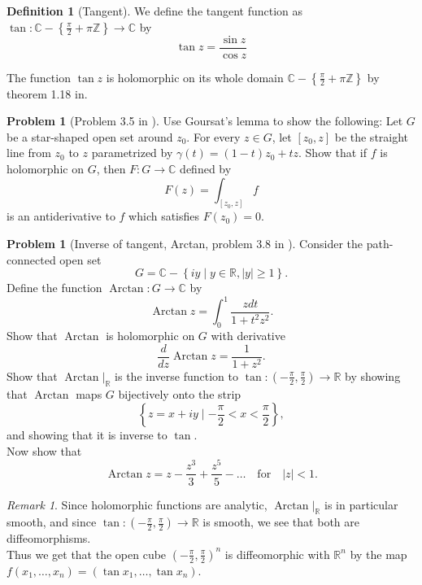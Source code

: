 \documentclass[reqno]{amsart}
\theoremstyle{plain}%
\theoremstyle{definition}
\newtheorem{definition}[theorem]{Definition}
\newtheorem{problem}[theorem]{Problem}
\theoremstyle{remark}
\newtheorem*{remark}{Remark}
\DeclareMathOperator{\Arctan}{Arctan}
\begin{document}
    \begin{definition}[Tangent]
        We define the tangent function as $\tan  \colon
        \mathbb{C} - \left\{ \frac{\pi}{2} + \pi \mathbb{Z} \right\} 
        \to \mathbb{C}$ by
        \[
        \tan z = \frac{\sin z}{\cos z}
        \] 
    \end{definition}
    The function $\tan z$ is holomorphic on its whole domain
    $\mathbb{C} - \left\{ \frac{\pi}{2} + \pi \mathbb{Z} \right\} $ by
    theorem 1.18 in. \cite{Berg}

    \begin{problem}[Problem 3.5 in \cite{Berg}]
        Use Goursat's lemma to show the following: Let
        $G$ be a star-shaped open set around $z_0$. For every
        $z \in G$, let $\left[ z_0, z \right] $ be the straight
        line from $z_0$ to $z$ parametrized by
        $\gamma (t) = \left( 1-t \right) z_0 + tz$. Show that
        if $f$ is holomorphic on $G$, then
        $F  \colon G \to \mathbb{C}$ defined by
        \[
        F(z) = \int_{\left[ z_0, z \right] } f
        \] 
        is an antiderivative to $f$ which satisfies
        $F(z_0) = 0$.
    \end{problem}
    

    \begin{problem}[Inverse of tangent, Arctan, problem 3.8 in
        \cite{Berg}]
    Consider the path-connected open set
    \[
    G = \mathbb{C} - \left\{ iy  \mid y\in \mathbb{R},
    \left| y \right| \ge 1 \right\} .
    \] 
    Define the function $\Arctan  \colon G \to \mathbb{C}$ by
    \[
    \Arctan z = \int_{0}^{1}  \frac{z dt}{1+ t^2 z^2}. 
    \] 
    Show that $\Arctan$ is holomorphic on $G$ with derivative
    \[
    \frac{d}{dz} \Arctan z = \frac{1}{1+ z^2}.
    \] 
    Show that $\Arctan |_{\mathbb{R}}$ is the inverse
    function to $\tan  \colon \left( -\frac{\pi}{2},\frac{\pi}{2} \right)
    \to \mathbb{R}$ by showing that $\Arctan$ maps $G$ bijectively
    onto the strip
    \[
    \left\{ z = x+iy  \mid 
    -\frac{\pi}{2} < x < \frac{\pi}{2} \right\} ,
    \] 
    and showing that it is inverse to $\tan $.\\
    Now show that
    \[
    \Arctan z = z - \frac{z^3}{3} + \frac{z^{5}}{5} -\ldots 
    \quad \text{for} \quad \left| z \right| <1.
    \] 
    
    
    
    
    \end{problem}

\begin{remark}
    Since holomorphic functions are analytic, $\Arctan|_{\mathbb{R}}$ 
    is in particular smooth, and since $\tan  \colon
    \left( - \frac{\pi}{2}, \frac{\pi}{2} \right) \to \mathbb{R}$ 
    is smooth, we see that both are diffeomorphisms.\\
    Thus we get that the open cube
    $\left( -\frac{\pi}{2},\frac{\pi}{2} \right)^{n}$ is diffeomorphic
    with $\mathbb{R}^{n}$ by the map
    $f (x_1,\ldots, x_n) = \left( \tan x_1, \ldots, \tan x_n \right) $.
\end{remark}










\newpage

\end{document}
